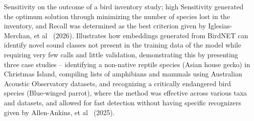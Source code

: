 \documentclass[conference]{IEEEtran}
\begin{document}
Sensitivity on the outcome of a bird inventory study; high Sensitivity generated the optimum solution through minimizing the number of species lost in the inventory, and Recall was determined as the best criterion given by Iglesias-Merchan, et al~\cite{b14} (2026). Illustrates how embeddings generated from BirdNET can identify novel sound classes not present in the training data of the model while requiring very few calls and little validation, demonstrating this by presenting three case studies -- identifying a non-native reptile species (Asian house gecko) in Christmas Island, compiling lists of amphibians and mammals using Australian Acoustic Observatory datasets, and recognizing a critically endangered bird species (Blue-winged parrot), where the method was effective across various taxa and datasets, and allowed for fast detection without having specific recognizers given by Allen-Ankins, et al~\cite{b15} (2025).
\end{document}
